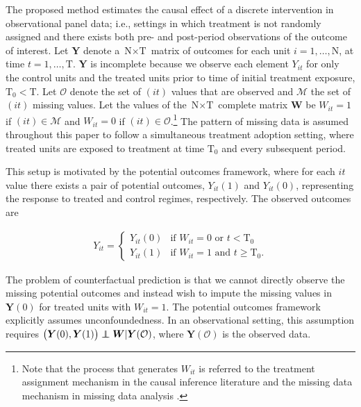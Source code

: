 \documentclass[hidelinks,12pt]{article}
\newcommand\independent{\protect\mathpalette{\protect\independenT}{\perp}}
\def\independenT#1#2{\mathrel{\rlap{$#1#2$}\mkern2mu{#1#2}}}
\begin{document}
The proposed method estimates the causal effect of a discrete intervention in observational panel data; i.e., settings in which treatment is not randomly assigned and there exists both pre- and post-period observations of the outcome of interest. Let $\boldsymbol{Y}$ denote a $\text{N} \times \text{T}$ matrix of outcomes for each unit $i =1, \ldots, \text{N}$, at time $t = 1, \ldots, \text{T}$. $\boldsymbol{Y}$ is incomplete because we observe each element $Y_{it}$ for only the control units and the treated units prior to time of initial treatment exposure, $\text{T}_0 < \text{T}$. Let $\mathcal{O}$ denote the set of $(it)$ values that are observed and $\mathcal{M}$ the set of $(it)$ missing values. Let the values of the $\text{N} \times \text{T}$ complete matrix $\boldsymbol{W}$ be $W_{it} =1$ if $(it) \in \mathcal{M}$ and $W_{it} = 0$ if $(it) \in \mathcal{O}$.\footnote{Note that the process that generates $W_{it}$ is referred to the treatment assignment mechanism in the causal inference literature \citep{imbens2015causal} and the missing data mechanism in missing data analysis \citep{little2014}.} The pattern of missing data is assumed throughout this paper to follow a simultaneous treatment adoption setting, where treated units are exposed to treatment at time $\text{T}_0$ and every subsequent period. 

This setup is motivated by the \citet{neyman1923} potential outcomes framework, where for each $it$ value there exists a pair of potential outcomes, $Y_{it}(1)$ and $Y_{it}(0)$, representing the response to treated and control regimes, respectively. The observed outcomes are 

\begin{align} 
Y_{it} = \begin{cases}
Y_{it}(0) 	& \mbox{if } W_{it} = 0  \text{ or } t < \text{T}_0 \\
Y_{it}(1) 	& \mbox{if } W_{it} = 1  \text{ and } t \geq \text{T}_0.
\end{cases} 
\end{align} 

The problem of counterfactual prediction is that we cannot directly observe the missing potential outcomes and instead wish to impute the missing values in $\boldsymbol{Y}(0)$ for treated units with $W_{it} =1$.  The potential outcomes framework explicitly assumes unconfoundedness. In an observational setting, this assumption requires $\left(\boldsymbol{Y}(0), \boldsymbol{Y}(1) \right) \independent \boldsymbol{W}| \boldsymbol{Y}(\mathcal{O})$, where $\boldsymbol{Y}(\mathcal{O})$ is the observed data. 
\end{document}
